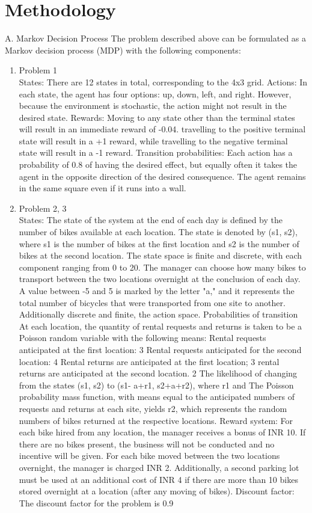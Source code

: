 \documentclass[conference]{IEEEtran}
\begin{document}
\section{Methodology} 
A. Markov Decision Process
The problem described above can be formulated as a
Markov decision process (MDP) with the following components:\\
\begin{enumerate}
    \item Problem 1 \\
    States: There are 12 states in total, corresponding to the
    4x3 grid.
    Actions: In each state, the agent has four options: up, down, left, and right. However, because the environment is stochastic, the action might not result in the desired state.
    Rewards: Moving to any state other than the terminal states will result in an immediate reward of -0.04. travelling to the positive terminal state will result in a +1 reward, while travelling to the negative terminal state will result in a -1 reward.
    Transition probabilities: Each action has a probability of 0.8 of having the desired effect, but equally often it takes the agent in the opposite direction of the desired consequence. The agent remains in the same square even if it runs into a wall.\\
    \item Problem 2, 3\\
    States: The state of the system at the end of each day
    is defined by the number of bikes available at each
    location. The state is denoted by (s1, s2), where s1 is
    the number of bikes at the first location and s2 is the
    number of bikes at the second location. The state space
    is finite and discrete, with each component ranging from
    0 to 20.
The manager can choose how many bikes to transport between the two locations overnight at the conclusion of each day. A value between -5 and 5 is marked by the letter "a," and it represents the total number of bicycles that were transported from one site to another. Additionally discrete and finite, the action space.
    Probabilities of transition At each location, the quantity of rental requests and returns is taken to be a Poisson random variable with the following means:
    Rental requests anticipated at the first location: 3 Rental requests anticipated for the second location: 4 Rental returns are anticipated at the first location; 3 rental returns are anticipated at the second location. 2
    The likelihood of changing from the states (s1, s2) to (s1- a+r1, s2+a+r2), where r1 and The Poisson probability mass function, with means equal to the anticipated numbers of requests and returns at each site, yields r2, which represents the random numbers of bikes returned at the respective locations.
    Reward system: For each bike hired from any location, the manager receives a bonus of INR 10. If there are no bikes present, the business will not be conducted and no incentive will be given. For each bike moved between the two locations overnight, the manager is charged INR 2. Additionally, a second parking lot must be used at an additional cost of INR 4 if there are more than 10 bikes stored overnight at a location (after any moving of bikes).
   Discount factor: The discount factor for the problem is 0.9
\end{enumerate}
\end{document}
